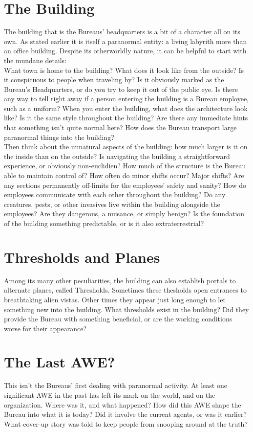 \documentclass[10pt,oneside,landscape]{memoir}
\begin{document}
\begin{multicols}{2}
\section*{The Building}
The building that is the Bureaus' headquarters is a bit of a character all on its own.  As stated earlier it is itself a paranormal entity: a living labyrith more than an office building.  Despite its otherworldly nature, it can be helpful to start with the mundane details:
\\[4mm]
What town is home to the building?  What does it look like from the outside?  Is it conspicuous to people when traveling by?  Is it obviously marked as the Bureau's Headquarters, or do you try to keep it out of the public eye.  Is there any way to tell right away if a person entering the building is a Bureau employee, such as a uniform?  When you enter the building, what does the architecture look like?  Is it the same style throughout the building?  Are there any immediate hints that something isn't quite normal here?  How does the Bureau transport large paranormal things into the building?
\\[4mm]
Then think about the unnatural aspects of the building: how much larger is it on the inside than on the outside?  Is navigating the building a straightforward experience, or obviously non-euclidien?  How much of the structure is the Bureau able to maintain control of?  How often do minor shifts occur?  Major shifts?  Are any sections permanently off-limits for the employees' safety and sanity?  How do employees communicate with each other throughout the building?  Do any creatures, pests, or other invasives live within the building alongside the employees?  Are they dangerous, a nuisance, or simply benign?  Is the foundation of the building something predictable, or is it also extraterrestrial?
%
\section*{Thresholds and Planes}
Among its many other peculiarities, the building can also establish portals to alternate planes, called Thresholds.   Sometimes these thesholds open entrances to breathtaking alien vistas.  Other times they appear just long enough to let something new into the building.  What thresholds exist in the building?  Did they provide the Bureau with something beneficial, or are the working conditions worse for their appearance?
%
\section*{The Last AWE?}
This isn't the Bureaus' first dealing with paranormal activity.  At least one significant AWE in the past has left its mark on the world, and on the organization.  Where was it, and what happened?  How did this AWE shape the Bureau into what it is today?  Did it involve the current agents, or was it earlier?  What cover-up story was told to keep people from snooping around at the truth?
%
\end{multicols}
%
\pagebreak
%
%
\end{document}
